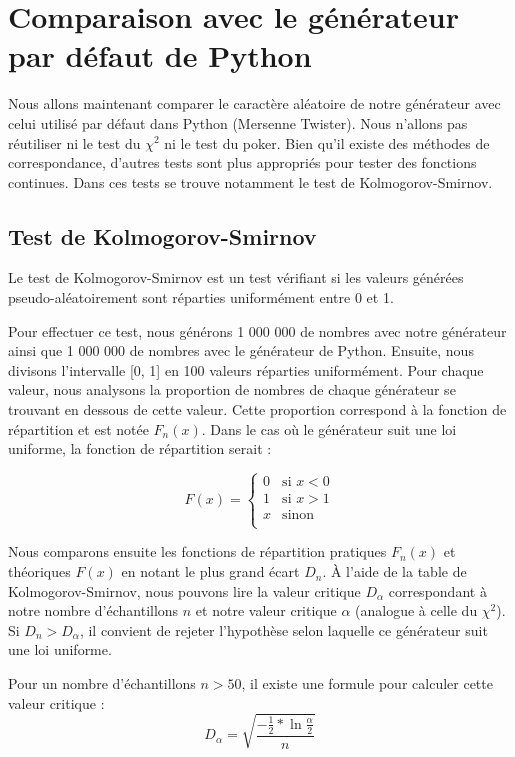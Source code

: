\documentclass[10pt,a4paper]{article}
\begin{document}
	\newpage
	\section{Comparaison avec le générateur par défaut de Python}
	Nous allons maintenant comparer le caractère aléatoire de notre générateur avec celui utilisé par défaut dans Python (Mersenne Twister).
	Nous n'allons pas réutiliser ni le test du $\chi^2$ ni le test du poker.
	Bien qu'il existe des méthodes de correspondance, d'autres tests sont plus appropriés pour tester des fonctions continues.
	Dans ces tests se trouve notamment le test de Kolmogorov-Smirnov.
	

	\subsection{Test de Kolmogorov-Smirnov}
	Le test de Kolmogorov-Smirnov est un test vérifiant si les valeurs générées pseudo-aléatoirement sont réparties uniformément entre 0 et 1.
	
	Pour effectuer ce test, nous générons 1 000 000 de nombres avec notre générateur ainsi que 1 000 000 de nombres avec le générateur de Python.
	Ensuite, nous divisons l'intervalle [0, 1] en 100 valeurs réparties uniformément.
	Pour chaque valeur, nous analysons la proportion de nombres de chaque générateur se trouvant en dessous de cette valeur.
	Cette proportion correspond à la fonction de répartition et est notée $F_n(x)$.
	Dans le cas où le générateur suit une loi uniforme, la fonction de répartition serait :
	
	\begin{equation*}
		F(x) = 
		\begin{cases}
			0 & \text{si } x < 0 \\
			1 & \text{si } x > 1\\
			x & \text{sinon }\\
		\end{cases}
	\end{equation*}
	
	Nous comparons ensuite les fonctions de répartition pratiques $F_n(x)$ et théoriques $F(x)$ en notant le plus grand écart $D_n$. 
	À l'aide de la table de Kolmogorov-Smirnov, nous pouvons lire la valeur critique $D_\alpha$ correspondant à notre nombre d'échantillons $n$ et notre valeur critique $\alpha$ (analogue à celle du $\chi^2$).
	Si $D_n > D_\alpha$, il convient de rejeter l'hypothèse selon laquelle ce générateur suit une loi uniforme.
	
	Pour un nombre d'échantillons $n > 50$, il existe une formule pour calculer cette valeur critique :
	\begin{equation*}
		D_\alpha = \sqrt{
			\frac{
			- \frac{1}{2} * \ln{\frac{\alpha}{2}}
			}{n}
		}
	\end{equation*}
	
\end{document}
